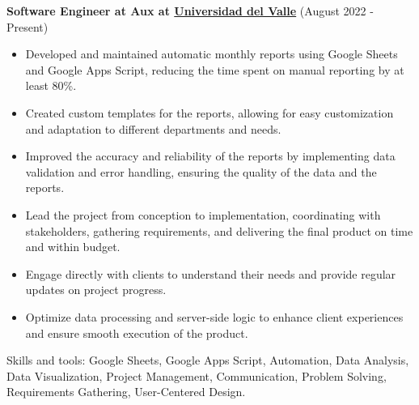 \vspace*{0.2cm}
\textbf{Software Engineer at Aux at \href{https://www.univalle.edu.co/}{Universidad del Valle}} (August 2022 - Present)
\hfill
\vspace*{0.2cm}
\begin{minipage}{\linewidth}
\begin{itemize}[noitemsep]
    \item Developed and maintained automatic monthly reports using Google Sheets and Google Apps Script, reducing the time spent on manual reporting by at least 80\%.
    \item Created custom templates for the reports, allowing for easy customization and adaptation to different departments and needs.
    \item Improved the accuracy and reliability of the reports by implementing data validation and error handling, ensuring the quality of the data and the reports.
    \item Lead the project from conception to implementation, coordinating with stakeholders, gathering requirements, and delivering the final product on time and within budget.
    \item Engage directly with clients to understand their needs and provide regular updates on project progress.
    \item Optimize data processing and server-side logic to enhance client experiences and ensure smooth execution of the product.
\end{itemize}
\hfill
\end{minipage}
Skills and tools: Google Sheets, Google Apps Script, Automation, Data Analysis, Data Visualization, Project Management, Communication, Problem Solving, Requirements Gathering, User-Centered Design.

\newpage

